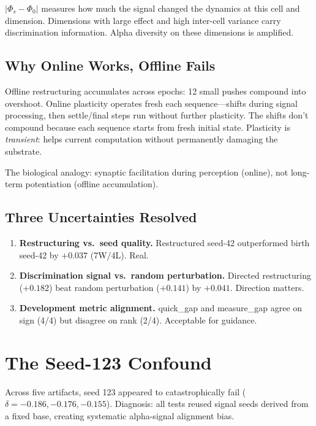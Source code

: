 \documentclass[11pt,a4paper]{article}
\begin{document}
$|\Phi_s - \Phi_0|$ measures how much the signal changed the dynamics at this cell and dimension. Dimensions with large effect and high inter-cell variance carry discrimination information. Alpha diversity on these dimensions is amplified.

\subsection{Why Online Works, Offline Fails}

Offline restructuring accumulates across epochs: 12 small pushes compound into overshoot. Online plasticity operates fresh each sequence---shifts during signal processing, then settle/final steps run without further plasticity. The shifts don't compound because each sequence starts from fresh initial state. Plasticity is \emph{transient}: helps current computation without permanently damaging the substrate.

The biological analogy: synaptic facilitation during perception (online), not long-term potentiation (offline accumulation).

\subsection{Three Uncertainties Resolved}

\begin{enumerate}[nosep]
\item \textbf{Restructuring vs.\ seed quality.} Restructured seed-42 outperformed birth seed-42 by $+0.037$ (7W/4L). Real.
\item \textbf{Discrimination signal vs.\ random perturbation.} Directed restructuring ($+0.182$) beat random perturbation ($+0.141$) by $+0.041$. Direction matters.
\item \textbf{Development metric alignment.} quick\_gap and measure\_gap agree on sign (4/4) but disagree on rank (2/4). Acceptable for guidance.
\end{enumerate}

\section{The Seed-123 Confound}
\label{sec:confound}

Across five artifacts, seed 123 appeared to catastrophically fail ($\delta = -0.186, -0.176, -0.155$). Diagnosis: all tests reused signal seeds derived from a fixed base, creating systematic alpha-signal alignment bias.
\end{document}
